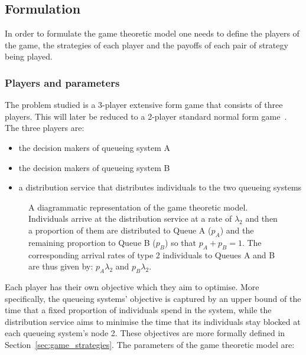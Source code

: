 \subsection{Formulation}

In order to formulate the game theoretic model one needs to define the players
of the game, the strategies of each player and the payoffs of each pair of
strategy being played.

\subsubsection{Players and parameters}

The problem studied is a 3-player extensive form game that consists of three
players.
This will later be reduced to a 2-player standard normal form
game~\cite{Maschler2013}.
The three players are:

\begin{itemize}
    \item the decision makers of queueing system A
    \item the decision makers of queueing system B
    \item a distribution service that distributes individuals to the two
    queueing systems
\end{itemize}

\begin{figure}[H]
    \centering
    
    \caption{A diagrammatic representation of the game theoretic model.
    Individuals arrive at the distribution service at a rate of \( \lambda_2 \)
    and then a proportion of them are distributed to Queue A (\(p_A\)) and the
    remaining proportion to Queue B (\(p_B\)) so that \(p_A + p_B = 1\).
    The corresponding arrival rates of type 2 individuals to Queues A and B are
    thus given by: \( p_A \lambda_2 \) and \( p_B \lambda_2 \).}
    \label{fig:diagram_of_game_theoretic_model}
\end{figure}

Each player has their own objective which they aim to optimise.
More specifically, the queueing systems' objective is captured by an upper bound
of the time that a fixed proportion of individuals spend in the system,
while the distribution service aims to minimise the time that its individuals
stay blocked at each queueing system's node 2.
These objectives are more formally defined in Section~\ref{sec:game_strategies}.
The parameters of the game theoretic model are:

